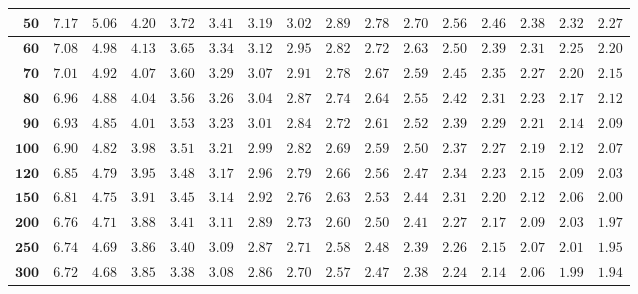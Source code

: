 \begin{alternateColorTable}
\begin{longtable}{|r|r|r|r|r|r|r|r|r|r|r|r|r|r|r|r|}
    \(\mathbf{50}\) & \(7.17\) & \(5.06\) & \(4.20\) & \(3.72\) & \(3.41\) & \(3.19\) & \(3.02\) & \(2.89\) & \(2.78\) & \(2.70\) & \(2.56\) & \(2.46\) & \(2.38\) & \(2.32\) & \(2.27\) \\ \hline 
    \(\mathbf{60}\) & \(7.08\) & \(4.98\) & \(4.13\) & \(3.65\) & \(3.34\) & \(3.12\) & \(2.95\) & \(2.82\) & \(2.72\) & \(2.63\) & \(2.50\) & \(2.39\) & \(2.31\) & \(2.25\) & \(2.20\) \\ \hline 
    \(\mathbf{70}\) & \(7.01\) & \(4.92\) & \(4.07\) & \(3.60\) & \(3.29\) & \(3.07\) & \(2.91\) & \(2.78\) & \(2.67\) & \(2.59\) & \(2.45\) & \(2.35\) & \(2.27\) & \(2.20\) & \(2.15\) \\ \hline 
    \(\mathbf{80}\) & \(6.96\) & \(4.88\) & \(4.04\) & \(3.56\) & \(3.26\) & \(3.04\) & \(2.87\) & \(2.74\) & \(2.64\) & \(2.55\) & \(2.42\) & \(2.31\) & \(2.23\) & \(2.17\) & \(2.12\) \\ \hline 
    \(\mathbf{90}\) & \(6.93\) & \(4.85\) & \(4.01\) & \(3.53\) & \(3.23\) & \(3.01\) & \(2.84\) & \(2.72\) & \(2.61\) & \(2.52\) & \(2.39\) & \(2.29\) & \(2.21\) & \(2.14\) & \(2.09\) \\ \hline 
    \(\mathbf{100}\) & \(6.90\) & \(4.82\) & \(3.98\) & \(3.51\) & \(3.21\) & \(2.99\) & \(2.82\) & \(2.69\) & \(2.59\) & \(2.50\) & \(2.37\) & \(2.27\) & \(2.19\) & \(2.12\) & \(2.07\) \\ \hline 
    \(\mathbf{120}\) & \(6.85\) & \(4.79\) & \(3.95\) & \(3.48\) & \(3.17\) & \(2.96\) & \(2.79\) & \(2.66\) & \(2.56\) & \(2.47\) & \(2.34\) & \(2.23\) & \(2.15\) & \(2.09\) & \(2.03\) \\ \hline 
    \(\mathbf{150}\) & \(6.81\) & \(4.75\) & \(3.91\) & \(3.45\) & \(3.14\) & \(2.92\) & \(2.76\) & \(2.63\) & \(2.53\) & \(2.44\) & \(2.31\) & \(2.20\) & \(2.12\) & \(2.06\) & \(2.00\) \\ \hline 
    \(\mathbf{200}\) & \(6.76\) & \(4.71\) & \(3.88\) & \(3.41\) & \(3.11\) & \(2.89\) & \(2.73\) & \(2.60\) & \(2.50\) & \(2.41\) & \(2.27\) & \(2.17\) & \(2.09\) & \(2.03\) & \(1.97\) \\ \hline 
    \(\mathbf{250}\) & \(6.74\) & \(4.69\) & \(3.86\) & \(3.40\) & \(3.09\) & \(2.87\) & \(2.71\) & \(2.58\) & \(2.48\) & \(2.39\) & \(2.26\) & \(2.15\) & \(2.07\) & \(2.01\) & \(1.95\) \\ \hline 
    \(\mathbf{300}\) & \(6.72\) & \(4.68\) & \(3.85\) & \(3.38\) & \(3.08\) & \(2.86\) & \(2.70\) & \(2.57\) & \(2.47\) & \(2.38\) & \(2.24\) & \(2.14\) & \(2.06\) & \(1.99\) & \(1.94\) \\ \hline 

\end{longtable}
\end{alternateColorTable}
